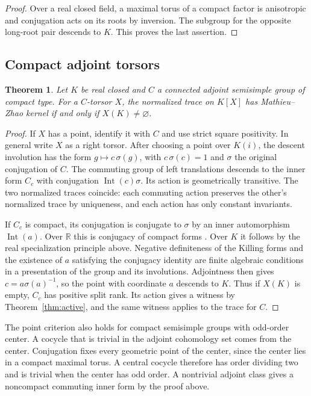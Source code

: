 \documentclass[11pt]{article}
\newtheorem{theorem}{Theorem}[section]
\newcommand{\RR}{\mathbb R}
\begin{document}
\begin{proof}
Over a real closed field, a maximal torus of a compact factor
is anisotropic and conjugation acts on its roots by inversion.
The subgroup for the opposite long-root pair descends to \(K\).
This proves the last assertion.
\end{proof}

\subsection{Compact adjoint torsors}

\begin{theorem}\label{thm:torsor}
Let \(K\) be real closed and \(C\) a connected adjoint semisimple
group of compact type. For a \(C\)-torsor \(X\), the normalized
trace on \(K[X]\) has Mathieu--Zhao kernel if and only if
\(X(K)\ne\varnothing\).
\end{theorem}

\begin{proof}
If \(X\) has a point, identify it with \(C\) and use strict square
positivity. In general write \(X\) as a right torsor. After choosing
a point over \(K(i)\), the descent involution has the form
\(g\mapsto c\,\sigma(g)\), with \(c\,\sigma(c)=1\) and \(\sigma\)
the original conjugation of \(C\). The commuting group of left
translations descends to the inner form \(C_c\) with conjugation
\(\operatorname{Int}(c)\sigma\). Its action is geometrically
transitive. The two normalized traces coincide: each commuting
action preserves the other's normalized trace by uniqueness,
and each action has only constant invariants.

If \(C_c\) is compact, its conjugation is conjugate to \(\sigma\)
by an inner automorphism \(\operatorname{Int}(a)\). Over \(\RR\)
this is conjugacy of compact forms \cite[Theorem~3.8]{AdamsTaibi}.
Over \(K\) it follows by the real specialization principle above.
Negative definiteness of the Killing forms and the existence
of \(a\) satisfying the conjugacy identity are finite algebraic
conditions in a presentation of the group and its involutions.
Adjointness then gives \(c=a\sigma(a)^{-1}\), so the point with
coordinate \(a\) descends to \(K\).
Thus if \(X(K)\) is empty, \(C_c\) has positive split rank.
Its action gives a witness by Theorem~\ref{thm:active}, and the
same witness applies to the trace for \(C\).
\end{proof}

The point criterion also holds for compact semisimple groups with
odd-order center. A cocycle that is trivial in the adjoint
cohomology set comes from the center. Conjugation fixes every
geometric point of the center, since the center lies in a compact
maximal torus. A central cocycle therefore has order dividing two
and is trivial when the center has odd order. A nontrivial adjoint
class gives a noncompact commuting inner form by the proof above.
\end{document}
